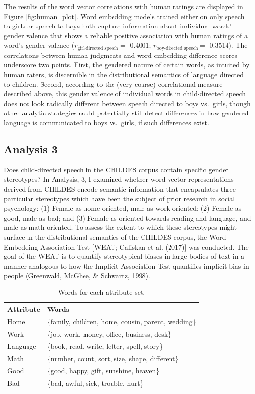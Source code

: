\documentclass[10pt, letterpaper]{article}
\begin{document}
The results of the word vector correlations with human ratings are
displayed in Figure \ref{fig:human_plot}. Word embedding models trained
either on only speech to girls or speech to boys both capture
information about individual words' gender valence that shows a reliable
positive association with human ratings of a word's gender valence
(\(r_\text{girl-directed speech} =\) 0.4001;
\(r_\text{boy-directed speech}=\) 0.3514). The correlations between
human judgments and word embedding difference scores underscore two
points. First, the gendered nature of certain words, as intuited by
human raters, is discernible in the distributional semantics of language
directed to children. Second, according to the (very coarse)
correlational measure described above, this gender valence of individual
words in child-directed speech does not look radically different between
speech directed to boys vs.~girls, though other analytic strategies
could potentially still detect differences in how gendered language is
communicated to boys vs.~girls, if such differences exist.

\hypertarget{analysis-3}{%
\subsection{Analysis 3}\label{analysis-3}}

Does child-directed speech in the CHILDES corpus contain specific gender
stereotypes? In Analysis, 3, I examined whether word vector
representations derived from CHILDES encode semantic information that
encapsulates three particular stereotypes which have been the subject of
prior research in social psychology: (1) Female as home-oriented, male
as work-oriented; (2) Female as good, male as bad; and (3) Female as
oriented towards reading and language, and male as math-oriented. To
assess the extent to which these stereotypes might surface in the
distributional semantics of the CHILDES corpus, the Word Embedding
Association Test {[}WEAT; Caliskan et al. (2017){]} was conducted. The
goal of the WEAT is to quantify stereotypical biases in large bodies of
text in a manner analogous to how the Implicit Association Test
quantifies implicit bias in people (Greenwald, McGhee, \& Schwartz,
1998).

\begin{table}

\caption{\label{tab:xtable}Words for each attribute set.}
\centering
\begin{tabular}[t]{l>{\raggedright\arraybackslash}p{2in}}
\toprule
Attribute & Words\\
\midrule
Home & \{family, children, home, cousin, parent, wedding\}\\
Work & \{job, work, money, office, business, desk\}\\
Language & \{book, read, write, letter, spell, story\}\\
Math & \{number, count, sort, size, shape, different\}\\
Good & \{good, happy, gift, sunshine, heaven\}\\
\addlinespace
Bad & \{bad, awful, sick, trouble, hurt\}\\
\bottomrule
\end{tabular}
\end{table}
\end{document}
